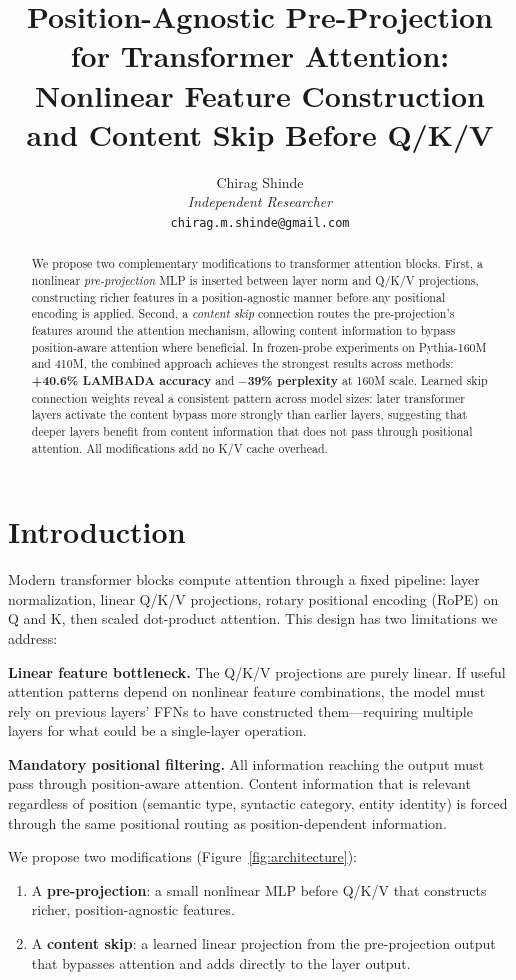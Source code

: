 \documentclass[11pt]{article}
\title{Position-Agnostic Pre-Projection for Transformer Attention:\\Nonlinear Feature Construction and Content Skip Before Q/K/V}
\author{
Chirag Shinde\\
\textit{Independent Researcher}\\
\texttt{chirag.m.shinde@gmail.com}
}
\date{}
\begin{document}
\maketitle

\begin{abstract}
We propose two complementary modifications to transformer attention blocks. First, a nonlinear \textit{pre-projection} MLP is inserted between layer norm and Q/K/V projections, constructing richer features in a position-agnostic manner before any positional encoding is applied. Second, a \textit{content skip} connection routes the pre-projection's features around the attention mechanism, allowing content information to bypass position-aware attention where beneficial. In frozen-probe experiments on Pythia-160M and 410M, the combined approach achieves the strongest results across methods: \textbf{+40.6\% LAMBADA accuracy} and \textbf{$-$39\% perplexity} at 160M scale. Learned skip connection weights reveal a consistent pattern across model sizes: later transformer layers activate the content bypass more strongly than earlier layers, suggesting that deeper layers benefit from content information that does not pass through positional attention. All modifications add no K/V cache overhead.
\end{abstract}

\section{Introduction}

Modern transformer blocks compute attention through a fixed pipeline: layer normalization, linear Q/K/V projections, rotary positional encoding (RoPE) on Q and K, then scaled dot-product attention. This design has two limitations we address:

\textbf{Linear feature bottleneck.} The Q/K/V projections are purely linear. If useful attention patterns depend on nonlinear feature combinations, the model must rely on previous layers' FFNs to have constructed them---requiring multiple layers for what could be a single-layer operation.

\textbf{Mandatory positional filtering.} All information reaching the output must pass through position-aware attention. Content information that is relevant regardless of position (semantic type, syntactic category, entity identity) is forced through the same positional routing as position-dependent information.

We propose two modifications (Figure~\ref{fig:architecture}):
\begin{enumerate}
    \item A \textbf{pre-projection}: a small nonlinear MLP before Q/K/V that constructs richer, position-agnostic features.
    \item A \textbf{content skip}: a learned linear projection from the pre-projection output that bypasses attention and adds directly to the layer output.
\end{enumerate}
\end{document}
